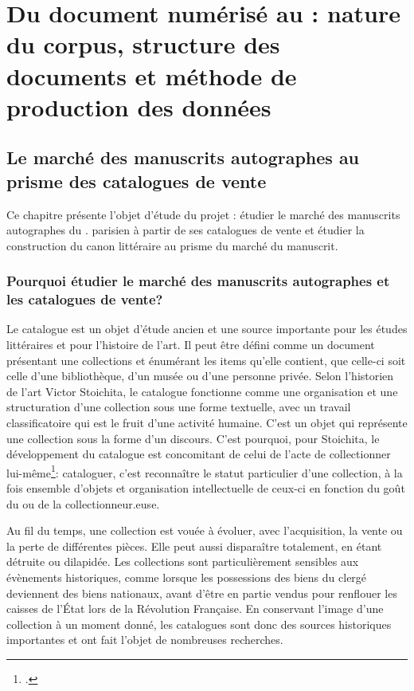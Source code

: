 
\part{Du document numérisé au \xmltei: nature du corpus, structure des documents et méthode de production des données}
\chapter{Le marché des manuscrits autographes au prisme des catalogues de vente}
Ce chapitre présente l'objet d'étude du projet \mss{} : étudier le marché des manuscrits autographes du . parisien à partir de ses catalogues de vente et étudier la construction du canon littéraire au prisme du marché du manuscrit.

\section{Pourquoi étudier le marché des manuscrits autographes et les catalogues de vente?}
Le catalogue est un objet d'étude ancien et une source importante pour les études littéraires et pour l'histoire de l'art. Il peut être défini comme un document présentant une collections et énumérant les items qu'elle contient, que celle-ci soit celle d'une bibliothèque, d'un musée ou d'une personne privée. Selon l'historien de l'art Victor Stoichita, le catalogue fonctionne comme une organisation et une structuration d'une collection sous une forme textuelle, avec un travail classificatoire qui est le fruit d'une activité humaine. C'est un objet qui représente une collection sous la forme d'un discours. C'est pourquoi, pour Stoichita, le développement du catalogue est concomitant de celui de l'acte de collectionner lui-même\footcite[p. 119-124]{stoichita_instauration_1993}: cataloguer, c'est reconnaître le statut particulier d'une collection, à la fois ensemble d'objets et organisation intellectuelle de ceux-ci en fonction du goût du ou de la collectionneur.euse.

Au fil du temps, une collection est vouée à évoluer, avec l'acquisition, la vente ou la perte de différentes pièces. Elle peut aussi disparaître totalement, en étant détruite ou dilapidée. Les collections sont particulièrement sensibles aux évènements historiques, comme lorsque les possessions des biens du clergé deviennent des biens nationaux, avant d'être en partie vendus pour renflouer les caisses de l'État lors de la Révolution Française. En conservant l'image d'une collection à un moment donné, les catalogues sont donc des sources historiques importantes et ont fait l'objet de nombreuses recherches.

